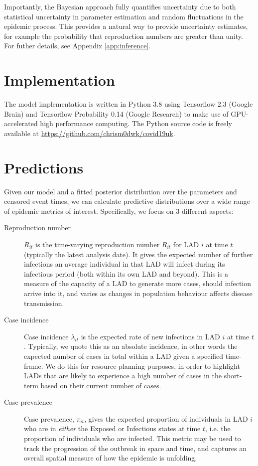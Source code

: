 \documentclass[a4paper]{article}
\begin{document}
Importantly, the  Bayesian approach fully quantifies uncertainty due to both statistical
uncertainty in parameter estimation and random fluctuations in the epidemic process.  This
provides a natural way to provide uncertainty estimates, for example the probability that
reproduction numbers are greater than unity. For futher details, see Appendix \ref{app:inference}.

\section{Implementation}

The model implementation is written in Python 3.8 using Tensorflow 2.3 (Google Brain) and Tensorflow
Probability 0.14 (Google Research) to make use of GPU-accelerated high performance
computing.  The Python source code is freely available at \url{https://github.com/chrism0dwk/covid19uk}.


\section{Predictions}
Given our model and a fitted posterior distribution over the parameters and censored event
times, we can calculate predictive distributions over a wide range of epidemic metrics of interest.
Specifically, we focus on 3 different aspects:
\begin{description}
\item[Reproduction number] $R_{it}$ is the time-varying reproduction number $R_{it}$ for
LAD $i$ at time $t$ (typically the latest analysis date).  It gives the expected
number of further infections an average individual in that LAD will infect
during its infectious period (both within its own LAD and beyond).  This is a measure of
the capacity of a LAD to generate more cases, should infection arrive into it, and varies
as changes in population behaviour affects disease transmission.

\item[Case incidence] Case incidence $\lambda_{it}$ is the expected rate of new
infections in LAD $i$ at time $t$.  Typically, we quote this as an absolute incidence, in
other words the expected number of cases in total within a LAD given a specified
time-frame.  We do this for resource planning purposes, in order to highlight LADs that
are likely to experience a high number of cases in the short-term based on their current
number of cases.  

\item[Case prevalence] Case prevalence, $\pi_{it}$, gives the expected proportion of
individuals in LAD $i$ who are in \emph{either} the Exposed or Infectious states at time
$t$, i.e. the proportion of individuals who are infected.  This metric may be used to
track the progression of the outbreak in space and time, and captures an overall spatial
measure of how the epidemic is unfolding.
\end{description}
\end{document}
